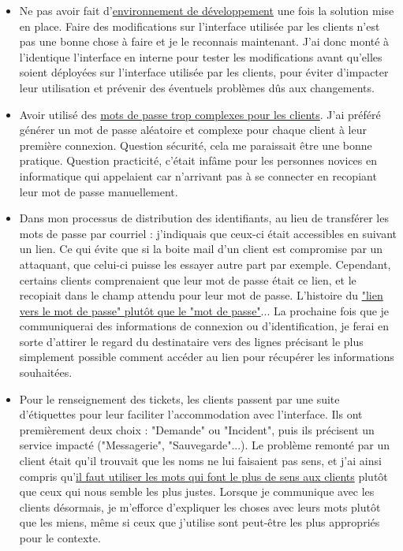 \begin{sloppypar}
\begin{itemize}
  \item Ne pas avoir fait d'\underline{environnement de développement} une fois la solution mise en place. Faire des modifications sur l'interface utilisée par les clients n'est pas une bonne chose à faire et je le reconnais maintenant. J'ai donc monté à l'identique l'interface en interne pour tester les modifications avant qu'elles soient déployées sur l'interface utilisée par les clients, pour éviter d'impacter leur utilisation et prévenir des éventuels problèmes dûs aux changements. 
  \item Avoir utilisé des \underline{mots de passe trop complexes pour les clients}. J’ai préféré générer un mot de passe aléatoire et complexe pour chaque client à leur première connexion. Question sécurité, cela me paraissait être une bonne pratique. Question practicité, c’était infâme pour les personnes novices en informatique qui appelaient car n'arrivant pas à se connecter en recopiant leur mot de passe manuellement.
  \item Dans mon processus de distribution des identifiants, au lieu de transférer les mots de passe par courriel : j’indiquais que ceux-ci était accessibles en suivant un lien. Ce qui évite que si la boite mail d’un client est compromise par un attaquant, que celui-ci puisse les essayer autre part par exemple. Cependant, certains clients comprenaient que leur mot de passe était ce lien, et le recopiait dans le champ attendu pour leur mot de passe. L’histoire du \underline{"lien vers le mot de passe" plutôt que le "mot de passe"}... La prochaine fois que je communiquerai des informations de connexion ou d’identification, je ferai en sorte d’attirer le regard du destinataire vers des lignes précisant le plus simplement possible comment accéder au lien pour récupérer les informations souhaitées.
  \item Pour le renseignement des tickets, les clients passent par une suite d’étiquettes pour leur faciliter l’accommodation avec l’interface. Ils ont premièrement deux choix : "Demande" ou "Incident", puis ils précisent un service impacté ("Messagerie", "Sauvegarde"...). Le problème remonté par un client était qu'il trouvait que les noms ne lui faisaient pas sens, et j'ai ainsi compris qu'\underline{il faut utiliser les mots qui font le plus de sens aux clients} plutôt que ceux qui nous semble les plus justes. Lorsque je communique avec les clients désormais, je m’efforce d’expliquer les choses avec leurs mots plutôt que les miens, même si ceux que j’utilise sont peut-être les plus appropriés pour le contexte.
\end{itemize}


\end{sloppypar}
